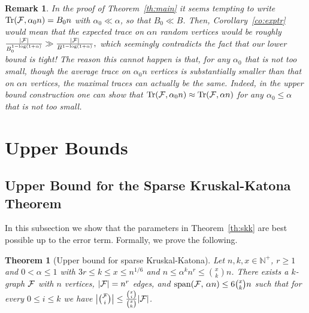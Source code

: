 \documentclass[11pt]{article}
\newtheorem{theo}{Theorem}[section]
\newtheorem{theo}{Theorem}[section]
\newtheorem*{remark*}{Remark}
\newcommand{\FF}{{\cal F}}
\renewcommand{\wp}{\mathrm{span}}
\renewcommand{\a}{\alpha}
\newcommand{\N}{\mathbb{N}}
\DeclareMathOperator{\trace}{Tr}
\begin{document}
\begin{remark*}
	In the proof of Theorem~\ref{th:main} it seems tempting to write $\trace(\FF,\alpha_0 n) = B_0 n$ with $\alpha_0 \ll \alpha$, so that $B_0 \ll B$. Then, Corollary~\ref{co:exptr} would mean that the expected trace on $\alpha n$ random vertices would be roughly $\frac{|\FF|}{B_0^{1-\log(1+\a)}} \gg \frac{|\FF|}{B^{1-\log(1+\a)}},$ which seemingly contradicts the fact that our lower bound is tight!
	The reason this cannot happen is that, for any $\alpha_0$ that is not too small, though the \emph{average} trace on $\alpha_0 n$ vertices is substantially smaller than that on $\alpha n$ vertices, the \emph{maximal} traces can actually be the same. Indeed, in the upper bound construction one can show that $\trace(\FF,\alpha_0 n) \approx \trace(\FF,\alpha n)$ for any $\alpha_0 \le \alpha$ that is not too small.
\end{remark*}

%


\section{Upper Bounds}%

\subsection{Upper Bound for the Sparse Kruskal-Katona Theorem}\label{sec:sKK-UB}

In this subsection we show that the parameters in Theorem~\ref{th:skk} are best possible up to the error term. Formally, we prove the following. %

\begin{theo}[Upper bound for sparse Kruskal-Katona]\label{theo:sKK-UB}
	Let $n,k,x \in \N^+$, $r \ge 1$ and $0 < \a \le 1$ with 
	$3r \le k \le x \le n^{1/6}$
	and $n \le \a^k n^r \le \binom{x}{k}n$.
	There exists a $k$-graph $\FF$ with $n$ vertices, $|\FF|=n^r$ edges, 
	and 
	$\wp(\FF,\,\a n) \le 6\binom{x}{k}n$
	such that for every $0 \le i \le k$ we have 
	$\big|\binom{\FF}{i}\big| \le \frac{\binom{x}{i}}{\binom{x}{k}}|\FF|$.
\end{theo} 
\end{document}
